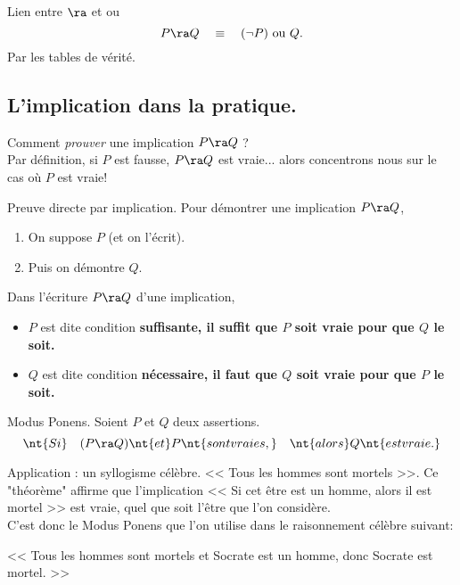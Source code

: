 \documentclass[11pt]{article}
\begin{document}
\begin{thm}{Lien entre $\ra$ et ou}{}
    \begin{equation*}
        P\ra Q \quad \equiv \quad (\lnot P) \text{ ou } Q.
    \end{equation*}
    \tcblower
    Par les tables de vérité.
\end{thm}

\subsection{L'implication dans la pratique.}

Comment \emph{prouver} une implication $P\ra Q$ ?\\
Par définition, si $P$ est fausse, $P\ra Q$ est vraie... alors concentrons nous sur le cas où $P$ est vraie!
\vspace*{0.3cm}

\begin{meth}{Preuve directe par implication.}{}
    Pour démontrer une implication $P\ra Q$,
    \begin{enumerate}[topsep=0pt,itemsep=-0.9 ex]
        \item On suppose $P$ (et on l'écrit).
        \item Puis on démontre $Q$.
    \end{enumerate}
\end{meth}

\begin{defi}{}{}
    Dans l'écriture $P\ra Q$ d'une implication,
    \begin{itemize}[topsep=0pt,itemsep=-0.9 ex]
        \item $P$ est dite condition \bf{suffisante}, il suffit que $P$ soit vraie pour que $Q$ le soit.
        \item $Q$ est dite condition \bf{nécessaire}, il faut que $Q$ soit vraie pour que $P$ le soit.
    \end{itemize}
\end{defi}

\begin{prop}{Modus Ponens.}{}
    Soient $P$ et $Q$ deux assertions.
    \begin{equation*}
        \nt{Si} \quad (P \ra Q) \nt{ et } P \nt{ sont vraies,} \quad \nt{alors } Q \nt{ est vraie.}
    \end{equation*}
\end{prop}

\begin{ex}{Application : un syllogisme célèbre.}{}
    << Tous les hommes sont mortels >>. Ce "théorème" affirme que l'implication << Si cet être est un homme, alors il est mortel >> est vraie, quel que soit l'être que l'on considère.\\
    C'est donc le Modus Ponens que l'on utilise dans le raisonnement célèbre suivant:
    \begin{center}
        << Tous les hommes sont mortels et Socrate est un homme, donc Socrate est mortel. >>
    \end{center}
\end{ex}
\end{document}
